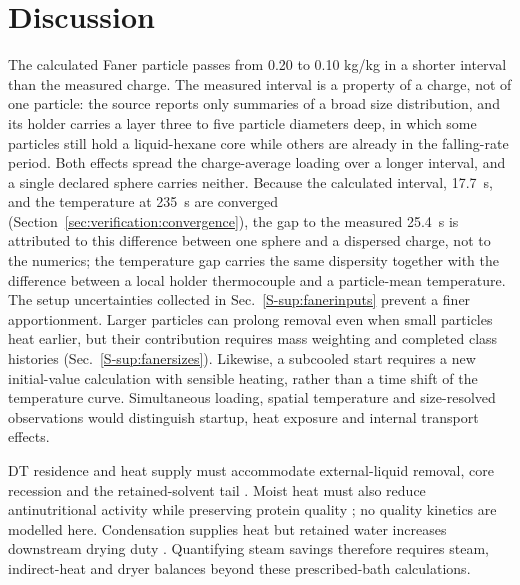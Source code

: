 \section{Discussion}\label{sec:discussion}\label{sec:discussion:scope}
\label{sec:discussion:coefficients}\label{sec:discussion:refusal}\label{sec:discussion:envelope}
The calculated Faner particle passes from 0.20 to 0.10 kg/kg in a shorter
interval than the measured charge. The measured interval is a property of
a charge, not of one particle: the source reports only summaries of a
broad size distribution, and its holder carries a layer three to five
particle diameters deep, in which some particles still hold a liquid-hexane
core while others are already in the falling-rate period. Both effects
spread the charge-average loading over a longer interval, and a single
declared sphere carries neither. Because the calculated interval, 17.7~s,
and the temperature at 235~s are converged
(Section~\ref{sec:verification:convergence}), the gap to the measured
25.4~s is attributed to this difference between one sphere and a dispersed
charge, not to the numerics; the temperature gap carries
the same dispersity together with the difference between a local holder
thermocouple and a particle-mean temperature. The setup
uncertainties collected in Sec.~\ref*{S-sup:fanerinputs} prevent a finer
apportionment. Larger particles can prolong
removal even when small particles heat earlier, but their contribution
requires mass weighting and completed class histories
(Sec.~\ref*{S-sup:fanersizes}). Likewise, a subcooled start requires a new
initial-value calculation with sensible heating, rather than a time shift
of the temperature curve. Simultaneous loading, spatial temperature and
size-resolved observations would distinguish startup, heat exposure and
internal transport effects.

DT residence and heat supply must accommodate external-liquid removal,
core recession and the retained-solvent tail \citep{kemper2013solvent}.
Moist heat must also reduce antinutritional activity while preserving
protein quality \citep{witte_nd_soybeanmeal,mustakas1981critical}; no
quality kinetics are modelled here. Condensation supplies heat but retained
water increases downstream drying duty \citep{witte_nd_soybeanmeal}.
Quantifying steam savings therefore requires steam, indirect-heat and
dryer balances beyond these prescribed-bath calculations.

